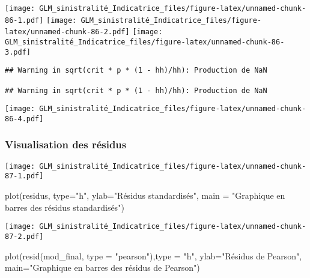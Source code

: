 \documentclass[
]{article}
\newenvironment{Shaded}{\begin{snugshade}}{\end{snugshade}}
\newcommand{\AttributeTok}[1]{\textcolor[rgb]{0.77,0.63,0.00}{#1}}
\newcommand{\FunctionTok}[1]{\textcolor[rgb]{0.00,0.00,0.00}{#1}}
\newcommand{\NormalTok}[1]{#1}
\newcommand{\SpecialCharTok}[1]{\textcolor[rgb]{0.00,0.00,0.00}{#1}}
\newcommand{\StringTok}[1]{\textcolor[rgb]{0.31,0.60,0.02}{#1}}
\begin{document}
\texttt{[image: GLM\_sinistralité\_Indicatrice\_files/figure-latex/unnamed-chunk-86-1.pdf]}
\texttt{[image: GLM\_sinistralité\_Indicatrice\_files/figure-latex/unnamed-chunk-86-2.pdf]}
\texttt{[image: GLM\_sinistralité\_Indicatrice\_files/figure-latex/unnamed-chunk-86-3.pdf]}

\begin{verbatim}
## Warning in sqrt(crit * p * (1 - hh)/hh): Production de NaN

## Warning in sqrt(crit * p * (1 - hh)/hh): Production de NaN
\end{verbatim}

\texttt{[image: GLM\_sinistralité\_Indicatrice\_files/figure-latex/unnamed-chunk-86-4.pdf]}

\hypertarget{visualisation-des-ruxe9sidus}{%
\subsubsection{Visualisation des
résidus}\label{visualisation-des-ruxe9sidus}}

\begin{Shaded}
\end{Shaded}

\texttt{[image: GLM\_sinistralité\_Indicatrice\_files/figure-latex/unnamed-chunk-87-1.pdf]}

\begin{Shaded}
\begin{Highlighting}[]
\FunctionTok{plot}\NormalTok{(residus, }\AttributeTok{type=}\StringTok{"h"}\NormalTok{, }\AttributeTok{ylab=}\StringTok{"Résidus standardisés"}\NormalTok{, }\AttributeTok{main =} \StringTok{"Graphique en barres des résidus standardisés"}\NormalTok{)}
\end{Highlighting}
\end{Shaded}

\texttt{[image: GLM\_sinistralité\_Indicatrice\_files/figure-latex/unnamed-chunk-87-2.pdf]}

\begin{Shaded}
\begin{Highlighting}[]
\FunctionTok{plot}\NormalTok{(}\FunctionTok{resid}\NormalTok{(mod\_final, }\AttributeTok{type =} \StringTok{"pearson"}\NormalTok{),}\AttributeTok{type =} \StringTok{"h"}\NormalTok{, }\AttributeTok{ylab=}\StringTok{"Résidus de Pearson"}\NormalTok{, }\AttributeTok{main=}\StringTok{"Graphique en barres des résidus de Pearson"}\NormalTok{)}
\end{Highlighting}
\end{Shaded}
\end{document}
